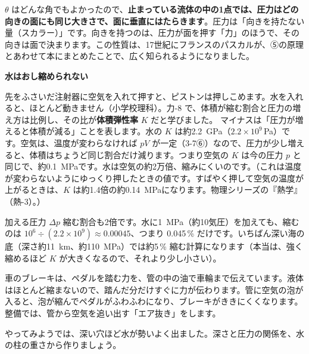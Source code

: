 $\theta$ はどんな角でもよかったので、\label{ph:力-12:muki}\textbf{止まっている流体の中の1点では、圧力はどの向きの面にも同じ大きさで、面に垂直にはたらきます}。圧力は「向きを持たない量（スカラー）」です。向きを持つのは、圧力が面を押す「力」のほうで、その向きは面で決まります。この性質は、17世紀にフランスのパスカルが、⑤の原理とあわせて本にまとめたことで、広く知られるようになりました。

\noindent\textbf{水はおし縮められない}\par\nobreak
\label{ph:力-12:K}先をふさいだ注射器に空気を入れて押すと、ピストンは押しこめます。水を入れると、ほとんど動きません（小学校理科）。力-8 で、体積が縮む割合と圧力の増え方は比例し、その比が\textbf{体積弾性率} $K$ だと学びました。
マイナスは「圧力が増えると体積が減る」ことを表します。水の $K$ は約\qty{2.2}{GPa}（$2.2\times10^9$\,Pa）です。空気は、温度が変わらなければ $pV$ が一定（3-7⑥）なので、圧力が少し増えると、体積はちょうど同じ割合だけ減ります。つまり空気の $K$ は今の圧力 $p$ と同じで、約\qty{0.1}{MPa}です。水は空気の約2万倍、縮みにくいのです。（これは温度が変わらないようにゆっくり押したときの値です。すばやく押して空気の温度が上がるときは、$K$ は約1.4倍の約\qty{0.14}{MPa}になります。物理シリーズの『熱学』（熱-3）。）
\begin{phbaisuru}{加える圧力 $\Delta p$}
縮む割合も2倍です。水に\qty{1}{MPa}（約10気圧）を加えても、縮むのは $10^6\div (2.2\times10^9)\approx0.00045$、つまり 0.045\,\% だけです。いちばん深い海の底（深さ約\qty{11}{km}、約\qty{110}{MPa}）では約5\,\% 縮む計算になります（本当は、強く縮めるほど $K$ が大きくなるので、それより少し小さい）。
\end{phbaisuru}
\begin{phmijika}[車のブレーキ]
車のブレーキは、ペダルを踏む力を、管の中の油で車輪まで伝えています。液体はほとんど縮まないので、踏んだ分だけすぐに力が伝わります。管に空気の泡が入ると、泡が縮んでペダルがふわふわになり、ブレーキがききにくくなります。整備では、管から空気を追い出す「エア抜き」をします。
\end{phmijika}


\leavevmode\label{ph:力-12:sec3}やってみようでは、深い穴ほど水が勢いよく出ました。深さと圧力の関係を、水の柱の重さから作りましょう。

